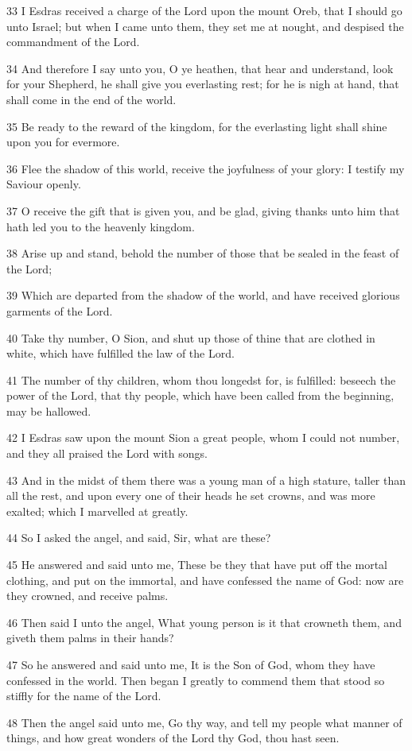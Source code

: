 \par 33 I Esdras received a charge of the Lord upon the mount Oreb, that I should go unto Israel; but when I came unto them, they set me at nought, and despised the commandment of the Lord.
\par 34 And therefore I say unto you, O ye heathen, that hear and understand, look for your Shepherd, he shall give you everlasting rest; for he is nigh at hand, that shall come in the end of the world.
\par 35 Be ready to the reward of the kingdom, for the everlasting light shall shine upon you for evermore.
\par 36 Flee the shadow of this world, receive the joyfulness of your glory: I testify my Saviour openly.
\par 37 O receive the gift that is given you, and be glad, giving thanks unto him that hath led you to the heavenly kingdom.
\par 38 Arise up and stand, behold the number of those that be sealed in the feast of the Lord;
\par 39 Which are departed from the shadow of the world, and have received glorious garments of the Lord.
\par 40 Take thy number, O Sion, and shut up those of thine that are clothed in white, which have fulfilled the law of the Lord.
\par 41 The number of thy children, whom thou longedst for, is fulfilled: beseech the power of the Lord, that thy people, which have been called from the beginning, may be hallowed.
\par 42 I Esdras saw upon the mount Sion a great people, whom I could not number, and they all praised the Lord with songs.
\par 43 And in the midst of them there was a young man of a high stature, taller than all the rest, and upon every one of their heads he set crowns, and was more exalted; which I marvelled at greatly.
\par 44 So I asked the angel, and said, Sir, what are these?
\par 45 He answered and said unto me, These be they that have put off the mortal clothing, and put on the immortal, and have confessed the name of God: now are they crowned, and receive palms.
\par 46 Then said I unto the angel, What young person is it that crowneth them, and giveth them palms in their hands?
\par 47 So he answered and said unto me, It is the Son of God, whom they have confessed in the world. Then began I greatly to commend them that stood so stiffly for the name of the Lord.
\par 48 Then the angel said unto me, Go thy way, and tell my people what manner of things, and how great wonders of the Lord thy God, thou hast seen.

